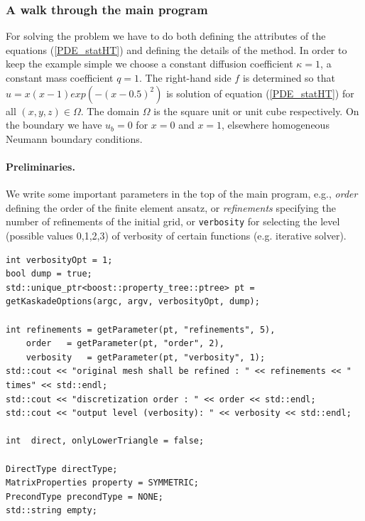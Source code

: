 \documentclass[11pt]{article}
\begin{document}
\subsubsection{A walk through the main program}

For solving the problem we have to do both defining the attributes of the equations (\ref{PDE_statHT}) and defining the details of the method.
In order to keep the example simple we choose a constant diffusion coefficient $\kappa=1$, a constant mass coefficient $q=1$.
The right-hand side $f$ is determined so that $u = x(x-1)exp(-(x-0.5)^2)$ is solution of equation (\ref{PDE_statHT}) for all
$(x,y,z) \in \Omega$. The domain $\Omega$ is the square unit or unit cube respectively. On the boundary we have 
$u_b =0$ for $x=0$ and $x=1$, elsewhere homogeneous Neumann boundary conditions.

\paragraph{Preliminaries.}
We write some important parameters in the top of the main program, e.g., {\em order} defining the order of the finite element ansatz, 
or {\em refinements} specifying the number of refinements of the initial grid, or {\tt verbosity} for selecting the level 
(possible values 0,1,2,3) of
verbosity of certain functions (e.g. iterative solver).

\begin{lstlisting}
int verbosityOpt = 1;
bool dump = true; 
std::unique_ptr<boost::property_tree::ptree> pt = 
getKaskadeOptions(argc, argv, verbosityOpt, dump);

int refinements = getParameter(pt, "refinements", 5),
    order 	= getParameter(pt, "order", 2),
    verbosity 	= getParameter(pt, "verbosity", 1);
std::cout << "original mesh shall be refined : " << refinements << " times" << std::endl;
std::cout << "discretization order : " << order << std::endl;
std::cout << "output level (verbosity): " << verbosity << std::endl;

int  direct, onlyLowerTriangle = false;

DirectType directType;
MatrixProperties property = SYMMETRIC;
PrecondType precondType = NONE;
std::string empty;
\end{lstlisting}
\end{document}

